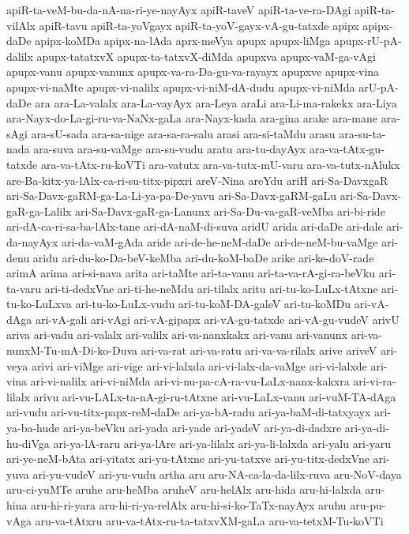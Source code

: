 {apiR-ta-veM-bu-da-nA-na-ri-ye-nayAyx
apiR-taveV
apiR-ta-ve-ra-DAgi
apiR-ta-vilAlx
apiR-tavu
apiR-ta-yoVgayx
apiR-ta-yoV-gayx-vA-gu-tatxde
apipx
apipx-daDe
apipx-koMDa
apipx-na-lAda
aprx-meVya
apupx
apupx-liMga
apupx-rU-pA-dalilx
apupx-tatatxvX
apupx-ta-tatxvX-diMda
apupxva
apupx-vaM-ga-vAgi
apupx-vanu
apupx-vanunx
apupx-va-ra-Da-gu-va-rayayx
apupxve
apupx-vina
apupx-vi-naMte
apupx-vi-nalilx
apupx-vi-niM-dA-dudu
apupx-vi-niMda
arU-pA-daDe
ara
ara-La-valalx
ara-La-vayAyx
ara-Leya
araLi
ara-Li-ma-rakekx
ara-Liya
ara-Nayx-do-La-gi-ru-va-NaNx-gaLa
ara-Nayx-kada
ara-gina
arake
ara-mane
ara-sAgi
ara-sU-sada
ara-sa-nige
ara-sa-ra-salu
arasi
ara-si-taMdu
arasu
ara-su-ta-nada
ara-suva
ara-su-vaMge
ara-su-vudu
aratu
ara-tu-dayAyx
ara-va-tAtx-gu-tatxde
ara-va-tAtx-ru-koVTi
ara-vatutx
ara-va-tutx-mU-varu
ara-va-tutx-nAlukx
are-Ba-kitx-ya-lAlx-ca-ri-su-titx-pipxri
areV-Nina
areYdu
ariH
ari-Sa-DavxgaR
ari-Sa-Davx-gaRM-ga-La-Li-ya-pa-De-yavu
ari-Sa-Davx-gaRM-gaLu
ari-Sa-Davx-gaR-ga-Lalilx
ari-Sa-Davx-gaR-ga-Lanunx
ari-Sa-Du-va-gaR-veMba
ari-bi-ride
ari-dA-ca-ri-sa-ba-lAlx-tane
ari-dA-naM-di-suva
aridU
arida
ari-daDe
ari-dale
ari-da-nayAyx
ari-da-vaM-gAda
aride
ari-de-he-neM-daDe
ari-de-neM-bu-vaMge
ari-denu
aridu
ari-du-ko-Da-beV-keMba
ari-du-koM-baDe
arike
ari-ke-doV-rade
arimA
arima
ari-si-nava
arita
ari-taMte
ari-ta-vanu
ari-ta-va-rA-gi-ra-beVku
ari-ta-varu
ari-ti-dedxVne
ari-ti-he-neMdu
ari-tilalx
aritu
ari-tu-ko-LuLx-tAtxne
ari-tu-ko-LuLxva
ari-tu-ko-LuLx-vudu
ari-tu-koM-DA-galeV
ari-tu-koMDu
ari-vA-dAga
ari-vA-gali
ari-vAgi
ari-vA-gipapx
ari-vA-gu-tatxde
ari-vA-gu-vudeV
arivU
ariva
ari-vadu
ari-valalx
ari-valilx
ari-va-nanxkakx
ari-vanu
ari-vanunx
ari-va-nunxM-Tu-mA-Di-ko-Duva
ari-va-rat
ari-va-ratu
ari-va-va-rilalx
arive
ariveV
ari-veya
arivi
ari-viMge
ari-vige
ari-vi-lalxda
ari-vi-lalx-da-vaMge
ari-vi-lalxde
ari-vina
ari-vi-nalilx
ari-vi-niMda
ari-vi-nu-pa-cA-ra-vu-LaLx-nanx-kakxra
ari-vi-ra-lilalx
arivu
ari-vu-LALx-ta-nA-gi-ru-tAtxne
ari-vu-LaLx-vanu
ari-vuM-TA-dAga
ari-vudu
ari-vu-titx-papx-reM-daDe
ari-ya-bA-radu
ari-ya-baM-di-tatxyayx
ari-ya-ba-hude
ari-ya-beVku
ari-yada
ari-yade
ari-yadeV
ari-ya-di-dadxre
ari-ya-di-hu-diVga
ari-ya-lA-raru
ari-ya-lAre
ari-ya-lilalx
ari-ya-li-lalxda
ari-yalu
ari-yaru
ari-ye-neM-bAta
ari-yitatx
ari-yu-tAtxne
ari-yu-tatxve
ari-yu-titx-dedxVne
ari-yuva
ari-yu-vudeV
ari-yu-vudu
artha
aru
aru-NA-ca-la-da-lilx-ruva
aru-NoV-daya
aru-ci-yuMTe
aruhe
aru-heMba
aruheV
aru-helAlx
aru-hida
aru-hi-lalxda
aru-hina
aru-hi-ri-yara
aru-hi-ri-ya-relAlx
aru-hi-si-ko-TaTx-nayAyx
aruhu
aru-pu-vAga
aru-va-tAtxru
aru-va-tAtx-ru-ta-tatxvXM-gaLa
aru-va-tetxM-Tu-koVTi
}
